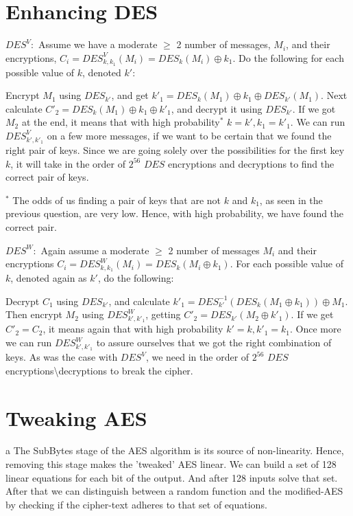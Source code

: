 \documentclass{article}
\begin{document}
\section{Enhancing DES}
\begin{paragraph}
	{$DES^V:$} Assume we have a moderate $\geq$ 2 number of messages, $M_i$, and their encryptions, $C_i = DES^V_{k, k_1}(M_i) = DES_k(M_i) \oplus k_1$. Do the following for each possible value of $k$, denoted $k'$:
	
	Encrypt $M_1$ using $DES_{k'}$, and get $k'_1 = DES_k(M_1) \oplus k_1 \oplus DES_{k'}(M_1)$. Next calculate $C'_2 = DES_k(M_1) \oplus k_1 \oplus k'_1$, and decrypt it using $DES_{k'}$. If we got $M_2$ at the end, it means that with high probability$^*$ $k = k', k_1 = k'_1$. We can run $DES^V_{k', k'_1}$ on a few more messages, if we want to be certain that we found the right pair of keys. Since we are going solely over the possibilities for the first key $k$, it will take in the order of $2^{56}$ $DES$ encryptions and decryptions to find the correct pair of keys.
	
	$^*$ The odds of us finding a pair of keys that are not $k$ and $k_1$, as seen in the previous question, are very low. Hence, with high probability, we have found the correct pair.
\end{paragraph}

\begin{paragraph}
    {$DES^{W}:$} Again assume a moderate $\geq$ 2 number of messages $M_i$ and their encryptions $C_{i} = DES^{W}_{k, k_1}(M_i) = DES_{k}(M_i \oplus k_1)$. For each possible value of $k$, denoted again as $k'$, do the following:
    
    Decrypt $C_1$ using $DES_{k'}$, and calculate $k'_1 = DES^{-1}_{k'}(DES_k(M_1 \oplus k_1)) \oplus M_1$. Then encrypt $M_2$ using $DES^W_{k', k'_1}$, getting $C'_2 = DES_{k'}(M_2 \oplus k'_1)$. If we get $C'_2 = C_2$, it means again that with high probability $k' = k, k'_1 = k_1$. Once more we can run $DES^W_{k', k'_1}$ to assure ourselves that we got the right combination of keys. As was the case with $DES^V$, we need in the order of $2^{56}$ $DES$ encryptions\textbackslash decryptions to break the cipher.
\end{paragraph}

\section{Tweaking AES}
\begin{paragraph}
	a The SubBytes stage of the AES algorithm is its source of non-linearity.
	Hence, removing this stage makes the 'tweaked' AES linear.
	We can build a set of 128 linear equations for each bit of the output. And after 128 inputs
	solve that set. After that we can distinguish between a random function and the modified-AES
	by checking if the cipher-text adheres to that set of equations.
\end{paragraph}
\end{document}
